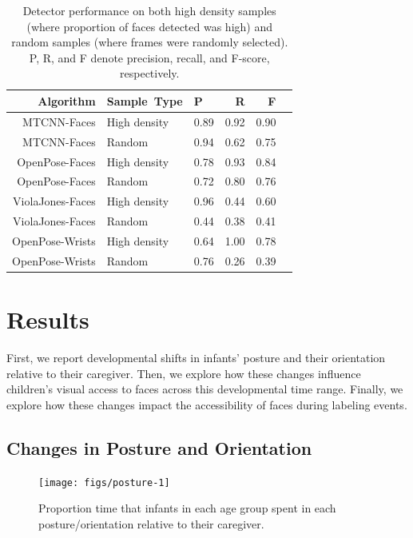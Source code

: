 \documentclass[10pt, letterpaper]{article}
\newenvironment{CodeChunk}{}{}
\begin{document}
\begin{table}[ht]
\centering
\begin{tabular}{rllrrr}
  \hline
   Algorithm & Sample\ Type & P & R & F \\ 
  \hline
  MTCNN-Faces & High density & 0.89 & 0.92 & 0.90 \\ 
  MTCNN-Faces & Random & 0.94 & 0.62 & 0.75 \\ 
  OpenPose-Faces & High density & 0.78 & 0.93 & 0.84 \\ 
  OpenPose-Faces & Random & 0.72 & 0.80 & 0.76 \\ 
  ViolaJones-Faces & High density & 0.96 & 0.44 & 0.60 \\ 
  ViolaJones-Faces & Random & 0.44 & 0.38 & 0.41 \\ 
  OpenPose-Wrists & High density & 0.64 & 1.00 & 0.78 \\ 
  OpenPose-Wrists & Random & 0.76 & 0.26 & 0.39 \\ 
   \hline
\end{tabular}
\caption{Detector performance on both high density samples (where proportion of faces detected was high) and random samples (where frames were randomly selected). P, R, and F denote precision, recall, and F-score, respectively.} 
\end{table}

\section{Results}\label{results}

First, we report developmental shifts in infants' posture and their
orientation relative to their caregiver. Then, we explore how these
changes influence children's visual access to faces across this
developmental time range. Finally, we explore how these changes impact
the accessibility of faces during labeling events.

\subsection{Changes in Posture and
Orientation}\label{changes-in-posture-and-orientation}

\begin{CodeChunk}
\begin{figure}[h]

{\centering \texttt{[image: figs/posture-1]} 

}

\caption[Proportion time that infants in each age group spent in each posture/orientation relative to their caregiver]{Proportion time that infants in each age group spent in each posture/orientation relative to their caregiver.}\label{fig:posture}
\end{figure}
\end{CodeChunk}
\end{document}
